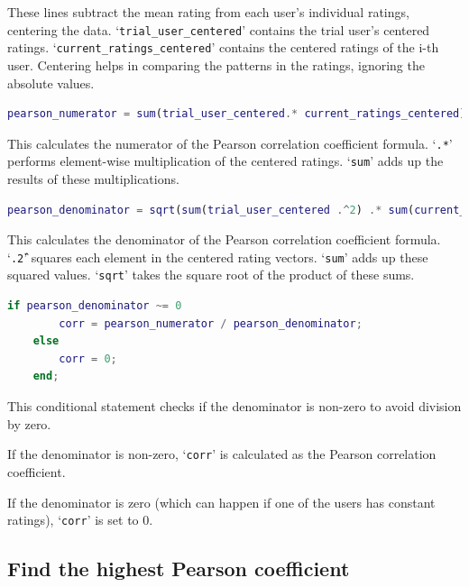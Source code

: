 These lines subtract the mean rating from each user's individual ratings, centering the data. ‘\texttt{trial\_user\_centered}’ contains the trial user's centered ratings.
‘\texttt{current\_ratings\_centered}’ contains the centered ratings of the i-th user.
Centering helps in comparing the patterns in the ratings, ignoring the absolute values.

\begin{lstlisting}[style=StyleCode, language=MATLAB]
	pearson_numerator = sum(trial_user_centered.* current_ratings_centered);
\end{lstlisting}

This calculates the numerator of the Pearson correlation coefficient formula. ‘\texttt{.*}’ performs element-wise multiplication of the centered ratings.
‘\texttt{sum}’ adds up the results of these multiplications.

\begin{lstlisting}[style=StyleCode, language=MATLAB]
	pearson_denominator = sqrt(sum(trial_user_centered .^2) .* sum(current_ratings_centered .^2));
\end{lstlisting}

This calculates the denominator of the Pearson correlation coefficient formula.
‘\texttt{.\^2}’ squares each element in the centered rating vectors.
‘\texttt{sum}’ adds up these squared values. ‘\texttt{sqrt}’ takes the square root of the product of these sums.

\begin{lstlisting}[style=StyleCode, language=MATLAB]
	if pearson_denominator ~= 0 
		corr = pearson_numerator / pearson_denominator; 
	else 
		corr = 0; 
	end; 
\end{lstlisting}

This conditional statement checks if the denominator is non-zero to avoid division by zero. 

If the denominator is non-zero, ‘\texttt{corr}’ is calculated as the Pearson correlation coefficient. 

If the denominator is zero (which can happen if one of the users has constant ratings), ‘\texttt{corr}’ is set to 0.

\subsection{Find the highest Pearson coefficient}

